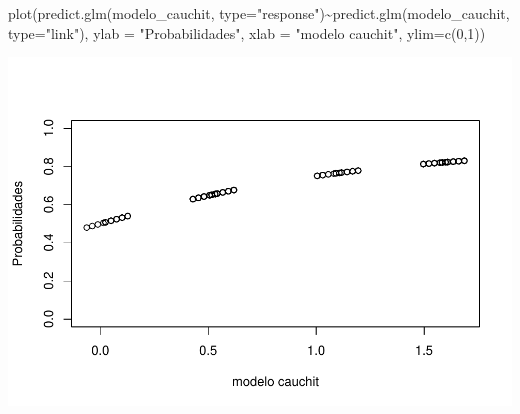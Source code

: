 \documentclass[
]{article}
\newenvironment{Shaded}{\begin{snugshade}}{\end{snugshade}}
\newcommand{\AttributeTok}[1]{\textcolor[rgb]{0.77,0.63,0.00}{#1}}
\newcommand{\DecValTok}[1]{\textcolor[rgb]{0.00,0.00,0.81}{#1}}
\newcommand{\FunctionTok}[1]{\textcolor[rgb]{0.00,0.00,0.00}{#1}}
\newcommand{\NormalTok}[1]{#1}
\newcommand{\SpecialCharTok}[1]{\textcolor[rgb]{0.00,0.00,0.00}{#1}}
\newcommand{\StringTok}[1]{\textcolor[rgb]{0.31,0.60,0.02}{#1}}
\begin{document}
\begin{Shaded}
\begin{Highlighting}[]
\FunctionTok{plot}\NormalTok{(}\FunctionTok{predict.glm}\NormalTok{(modelo\_cauchit, }\AttributeTok{type=}\StringTok{"response"}\NormalTok{)}\SpecialCharTok{\textasciitilde{}}\FunctionTok{predict.glm}\NormalTok{(modelo\_cauchit, }\AttributeTok{type=}\StringTok{"link"}\NormalTok{),}
     \AttributeTok{ylab =} \StringTok{"Probabilidades"}\NormalTok{,}
     \AttributeTok{xlab =}  \StringTok{"modelo cauchit"}\NormalTok{,}
     \AttributeTok{ylim=}\FunctionTok{c}\NormalTok{(}\DecValTok{0}\NormalTok{,}\DecValTok{1}\NormalTok{))}
\end{Highlighting}
\end{Shaded}

\includegraphics{EDA__files/figure-latex/unnamed-chunk-12-2.pdf}
\end{document}
